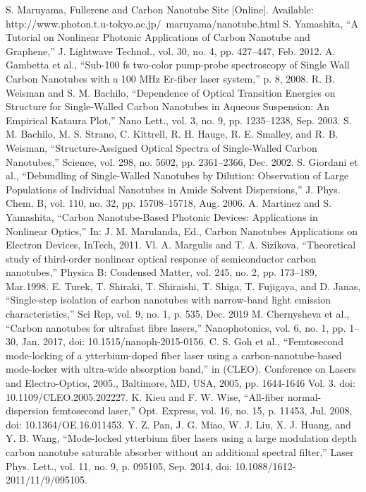 \begin{thebibliography}{99}
 S. Maruyama, Fullerene and Carbon Nanotube Site [Online]. Available: http://www.photon.t.u-tokyo.ac.jp/~maruyama/nanotube.html
 S. Yamashita, “A Tutorial on Nonlinear Photonic Applications of Carbon Nanotube and Graphene,” J. Lightwave Technol., vol. 30, no. 4, pp. 427–447, Feb. 2012.
A. Gambetta et al., “Sub-100 fs two-color pump-probe spectroscopy of Single Wall Carbon Nanotubes with a 100 MHz Er-fiber laser system,” p. 8, 2008.
 R. B. Weisman and S. M. Bachilo, “Dependence of Optical Transition Energies on Structure for Single-Walled Carbon Nanotubes in Aqueous Suspension: An Empirical Kataura Plot,” Nano Lett., vol. 3, no. 9, pp. 1235–1238, Sep. 2003.
 S. M. Bachilo, M. S. Strano, C. Kittrell, R. H. Hauge, R. E. Smalley, and R. B. Weisman, “Structure-Assigned Optical Spectra of Single-Walled Carbon Nanotubes,” Science, vol. 298, no. 5602, pp. 2361–2366, Dec. 2002. 
S. Giordani et al., “Debundling of Single-Walled Nanotubes by Dilution: Observation of Large Populations of Individual Nanotubes in Amide Solvent Dispersions,” J. Phys. Chem. B, vol. 110, no. 32, pp. 15708–15718, Aug. 2006.
 A. Martinez and S. Yamashita, “Carbon Nanotube-Based Photonic Devices: Applications in Nonlinear Optics,” In: J. M. Marulanda, Ed., Carbon Nanotubes Applications on Electron Devices, InTech, 2011. 
 Vl. A. Margulis and T. A. Sizikova, “Theoretical study of third-order nonlinear optical response of semiconductor carbon nanotubes,” Physica B: Condensed Matter, vol. 245, no. 2, pp. 173–189, Mar.1998.
 E. Turek, T. Shiraki, T. Shiraishi, T. Shiga, T. Fujigaya, and D. Janas, “Single-step isolation of carbon nanotubes with narrow-band light emission characteristics,” Sci Rep, vol. 9, no. 1, p. 535, Dec. 2019
 M. Chernysheva et al., “Carbon nanotubes for ultrafast fibre lasers,” Nanophotonics, vol. 6, no. 1, pp. 1–30, Jan. 2017, doi: 10.1515/nanoph-2015-0156.
 C. S. Goh et al., “Femtosecond mode-locking of a ytterbium-doped fiber laser using a carbon-nanotube-based mode-locker with ultra-wide absorption band,” in (CLEO). Conference on Lasers and Electro-Optics, 2005., Baltimore, MD, USA, 2005, pp. 1644-1646 Vol. 3. doi: 10.1109/CLEO.2005.202227.
 K. Kieu and F. W. Wise, “All-fiber normal-dispersion femtosecond laser,” Opt. Express, vol. 16, no. 15, p. 11453, Jul. 2008, doi: 10.1364/OE.16.011453.
 Y. Z. Pan, J. G. Miao, W. J. Liu, X. J. Huang, and Y. B. Wang, “Mode-locked ytterbium fiber lasers using a large modulation depth carbon nanotube saturable absorber without an additional spectral filter,” Laser Phys. Lett., vol. 11, no. 9, p. 095105, Sep. 2014, doi: 10.1088/1612-2011/11/9/095105.


\end{thebibliography}
